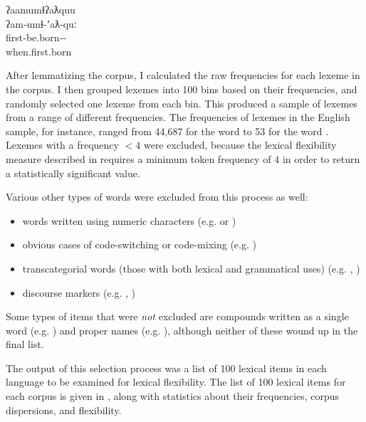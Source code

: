 \begin{exe}
  \ex\label{ex:3.1}
  \vfix
  \gllll ʔaamumɬʔaƛquu\\
         ʔam‑umɬ‑ʼaƛ‑quː\\
         first‑be.born‑‑\\
         when.first.born\\
         \vfix
\end{exe}

After lemmatizing the corpus, I calculated the raw frequencies for each lexeme in the corpus. I then grouped lexemes into 100 bins based on their frequencies, and randomly selected one lexeme from each bin. This produced a sample of lexemes from a range of different frequencies. The frequencies of lexemes in the English sample, for instance, ranged from 44,687 for the word  to 53 for the word . Lexemes with a frequency $<4$ were excluded, because the lexical flexibility measure described in  requires a minimum token frequency of 4 in order to return a statistically significant value.

Various other types of words were excluded from this process as well:

\begin{itemize}

  \singlespacing

  \item words written using numeric characters (e.g.  or )

  \item obvious cases of code-switching or code-mixing (e.g.  )

  \item transcategorial words (those with both lexical and grammatical uses) (e.g. , )

  \item discourse markers (e.g. , )

\end{itemize}

\noindent Some types of items that were \emph{not} excluded are compounds written as a single word (e.g. ) and proper names (e.g. ), although neither of these wound up in the final list.

The output of this selection process was a list of 100 lexical items in each language to be examined for lexical flexibility. The list of 100 lexical items for each corpus is given in , along with statistics about their frequencies, corpus dispersions, and flexibility.

